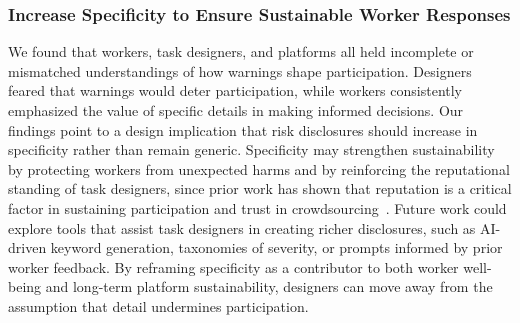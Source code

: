 \subsubsection{Increase Specificity to Ensure Sustainable Worker Responses}
We found that workers, task designers, and platforms all held incomplete or mismatched understandings of how warnings shape participation. Designers feared that warnings would deter participation, while workers consistently emphasized the value of specific details in making informed decisions. Our findings point to a design implication that risk disclosures should increase in specificity rather than remain generic. Specificity may strengthen sustainability by protecting workers from unexpected harms and by reinforcing the reputational standing of task designers, since prior work has shown that reputation is a critical factor in sustaining participation and trust in crowdsourcing~\cite{gaikwad2016boomerang, irani2013turkopticon}. Future work could explore tools that assist task designers in creating richer disclosures, such as AI-driven keyword generation, taxonomies of severity, or prompts informed by prior worker feedback. By reframing specificity as a contributor to both worker well-being and long-term platform sustainability, designers can move away from the assumption that detail undermines participation. 

